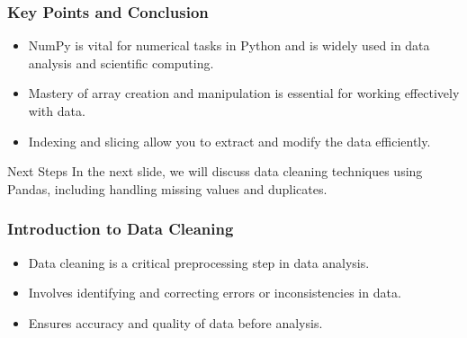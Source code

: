 \documentclass[aspectratio=169]{beamer}
\begin{document}
\begin{frame}
    \frametitle{Key Points and Conclusion}
    \begin{itemize}
        \item NumPy is vital for numerical tasks in Python and is widely used in data analysis and scientific computing.
        \item Mastery of array creation and manipulation is essential for working effectively with data.
        \item Indexing and slicing allow you to extract and modify the data efficiently.
    \end{itemize}
    \begin{block}{Next Steps}
        In the next slide, we will discuss data cleaning techniques using Pandas, including handling missing values and duplicates.
    \end{block}
\end{frame}

\begin{frame}
    \titlepage
\end{frame}

\begin{frame}
    \frametitle{Introduction to Data Cleaning}
    \begin{itemize}
        \item Data cleaning is a critical preprocessing step in data analysis.
        \item Involves identifying and correcting errors or inconsistencies in data.
        \item Ensures accuracy and quality of data before analysis.
    \end{itemize}
\end{frame}
\end{document}
